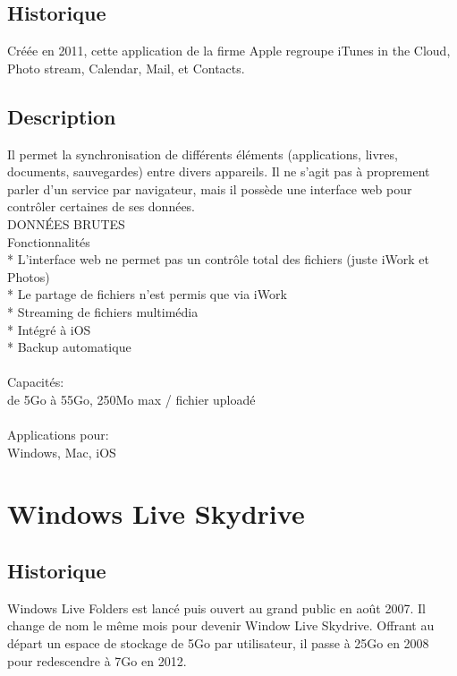 \subsection{Historique}
Créée en 2011, cette application de la firme Apple regroupe iTunes in the Cloud, Photo stream, Calendar, Mail, et Contacts.

\subsection{Description}
Il permet la synchronisation de différents éléments (applications, livres, documents, sauvegardes) entre divers appareils. Il ne s'agit pas à proprement parler d'un service par navigateur, mais il possède une interface web pour contrôler certaines de ses données.\\
DONNÉES BRUTES\\
Fonctionnalités\\
* L'interface web ne permet pas un contrôle total des fichiers (juste iWork et Photos)\\
* Le partage de fichiers n'est permis que via iWork\\
* Streaming de fichiers multimédia\\
* Intégré à iOS\\
* Backup automatique\\
\\
Capacités:\\
de 5Go à 55Go, 250Mo max / fichier uploadé\\
\\
Applications pour:\\
Windows, Mac, iOS\\


\section{Windows Live Skydrive}

\subsection{Historique}
Windows Live Folders est lancé puis ouvert au grand public en août 2007. Il change de nom le même mois pour devenir Window Live Skydrive. Offrant au départ un espace de stockage de 5Go par utilisateur, il passe à 25Go en 2008 pour redescendre à 7Go en 2012.\\

